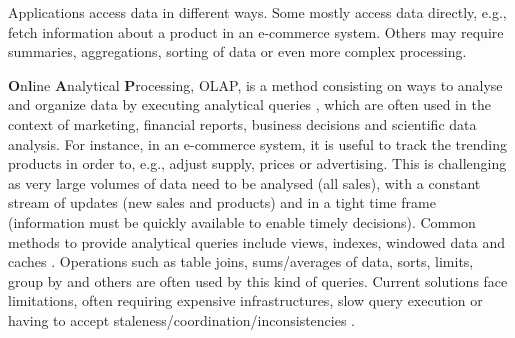 
Applications access data in different ways.
Some mostly access data directly, e.g., fetch information about a product in an e-commerce system.
Others may require summaries, aggregations, sorting of data or even more complex processing.


\textbf{O}n\textbf{l}ine \textbf{A}nalytical \textbf{P}rocessing, OLAP, is a method consisting on ways to analyse and organize data by executing analytical queries \cite{dbtoaster, viewSelection, optIncMaintenance, effMaintenance}, which are often used in the context of marketing, financial reports, business decisions and scientific data analysis. 
For instance, in an e-commerce system, it is useful to track the trending products in order to, e.g., adjust supply, prices or advertising.
This is challenging as
very large volumes of data need to be analysed (all sales), with a constant stream of updates (new sales and products) and in a tight time frame (information must be quickly available to enable timely decisions).
Common methods to provide analytical queries include views, indexes, windowed data and caches \cite{noria, dbtoaster, pequod, txcache, viewSelection, optIncMaintenance, effMaintenance}.
Operations such as table joins, sums/averages of data, sorts, limits, group by and others are often used by this kind of queries. 
Current solutions face limitations, often requiring expensive infrastructures, slow query execution or having to accept staleness/coordination/inconsistencies \cite{noria, analyticdb, hadad, clickhouse, dbtoaster, slog}.



